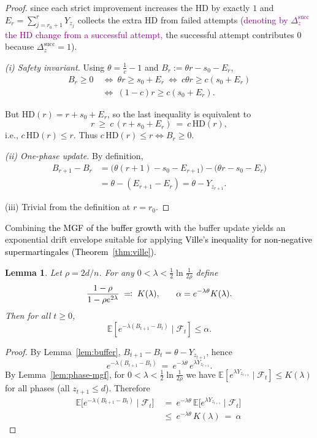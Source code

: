 \documentclass[lettersize,journal]{IEEEtran}
\newcommand{\rerev}[1]{\textcolor{purple}{#1}}
\newcommand{\rev}[1]{\textcolor{black}{#1}}
\newcommand{\EE}{\mathbb{E}}
\newcommand{\HD}{\text{HD}}
\newtheorem{lemma}{Lemma}
\begin{document}
{\begin{proof}
	since each strict improvement increases the HD by exactly $1$ and $E_r=\sum_{j=r_0+1}^r Y_{z_j}$ collects the extra HD from failed attempts (\rerev{denoting by $\Delta_z^{\mathrm{succ}}$ the HD change from a successful attempt,} the successful attempt contributes $0$ because $\Delta_z^{\mathrm{succ}}=1$).
	
	\smallskip
	\emph{(i) Safety invariant.}
	Using $\theta=\tfrac{1}{c}-1$ and $B_r:=\theta r - s_0 - E_r$,
	\begin{align*}
		B_r\ge 0
		\ &\Longleftrightarrow\
		\theta r \ge s_0+E_r
		\ \Longleftrightarrow\
		c\theta r \ge c(s_0+E_r)
		\\ &\Longleftrightarrow\
		(1-c)r \ge c(s_0+E_r).	
	\end{align*}
	
	
	But $\HD(r)=r+s_0+E_r$, so the last inequality is equivalent to
	\[
	r \ \ge\ c\,(r+s_0+E_r)\ =\ c\,\HD(r),
	\]
	i.e., $c\,\HD(r)\le r$. Thus $c\,\HD(r)\le r \iff B_r\ge 0$.
	
	\smallskip
	\emph{(ii) One-phase update.}
	By definition,
	\begin{align*}
		B_{r+1}-B_r
		&= \bigl(\theta(r+1)-s_0-E_{r+1}\bigr) - \bigl(\theta r - s_0 - E_r\bigr)
		\\&= \theta - (E_{r+1}-E_r)
		= \theta - Y_{z_{r+1}}.
	\end{align*}
	
	
	
	\smallskip
	(iii) Trivial from the definition at $r=r_0$.
\end{proof}

Combining \rev{the MGF of the buffer growth} with the buffer update yields an exponential drift 
envelope suitable for applying \textcolor{black}{Ville's inequality for non-negative supermartingales (Theorem~\ref{thm:ville}).}

\begin{lemma}
\label{lem:drift-envelope-global}
	Let $\rho=2d/n$.  
	For any $0<\lambda<\tfrac12\ln\tfrac{1}{2\rho}$ define
	\[
	\textcolor{black}{\frac{1-\rho}{1-\rho e^{2\lambda}} \;\eqqcolon\; K(\lambda),}
	\qquad 
	\alpha=e^{-\lambda\theta}K(\lambda).
	\]
	Then for all $t\ge0$,
	\[
	\EE[e^{-\lambda(B_{t+1}-B_t)}\mid\mathcal{F}_t]\le \alpha.
	\]
\end{lemma}

\begin{proof}
	By Lemma~\ref{lem:buffer}, $B_{t+1}-B_t=\theta-Y_{z_{t+1}}$, hence
	\[
	e^{-\lambda(B_{t+1}-B_t)}\ =\ e^{-\lambda\theta}\,e^{\lambda Y_{z_{t+1}}}.
	\]
	By Lemma~\ref{lem:phase-mgf}, for $0<\lambda<\tfrac12\ln\!\tfrac{1}{2\rho}$ we have $\EE[e^{\lambda Y_{z_{t+1}}}\mid\mathcal F_t]\le K(\lambda)$ for all phases (all $z_{t+1}\le d$). Therefore
	\begin{align*}
		\EE\!\big[e^{-\lambda(B_{t+1}-B_t)}\mid \mathcal F_t\big]
		\ &=\ e^{-\lambda\theta}\,\EE\!\big[e^{\lambda Y_{z_{t+1}}}\mid\mathcal F_t\big]
		\ \\ &\le\ e^{-\lambda\theta}\,K(\lambda)
		\ =\ \alpha	
	\end{align*}
\end{proof}

}
\end{document}

